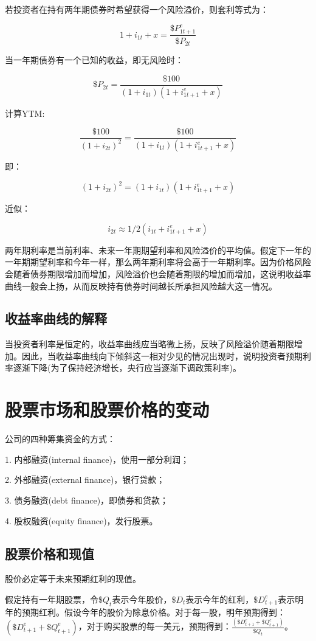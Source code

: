 \documentclass{article}
\begin{document}
若投资者在持有两年期债券时希望获得一个风险溢价，则套利等式为：

\[
1+i_{1t}+x=\frac{\$P^e_{1t+1}}{\$P_{2t}}
\]

当一年期债券有一个已知的收益，即无风险时：

\[
\$P_{2t}=\frac{\$100}{(1+i_{1t})(1+i^e_{1t+1}+x)}
\]

计算YTM:

\[
\frac{\$100}{(1+i_{2t})^2}=\frac{\$100}{(1+i_{1t})(1+i^e_{1t+1}+x)}
\]

即：

\[
(1+i_{2t})^2=(1+i_{1t})(1+i^e_{1t+1}+x)
\]

近似：

\[
i_{2t}\approx 1/2(i_{1t}+i^e_{1t+1}+x)
\]

两年期利率是当前利率、未来一年期期望利率和风险溢价的平均值。假定下一年的一年期期望利率和今年一样，那么两年期利率将会高于一年期利率。因为价格风险会随着债券期限增加而增加，风险溢价也会随着期限的增加而增加，这说明收益率曲线一般会上扬，从而反映持有债券时间越长所承担风险越大这一情况。

\subsection{收益率曲线的解释}

当投资者利率是恒定的，收益率曲线应当略微上扬，反映了风险溢价随着期限增加。因此，当收益率曲线向下倾斜这一相对少见的情况出现时，说明投资者预期利率逐渐下降(为了保持经济增长，央行应当逐渐下调政策利率)。

\section{股票市场和股票价格的变动}

公司的四种筹集资金的方式：

1. 内部融资(internal finance)，使用一部分利润；

2. 外部融资(external finance)，银行贷款；

3. 债务融资(debt finance)，即债券和贷款；

4. 股权融资(equity finance)，发行股票。


\subsection{股票价格和现值}

股价必定等于未来预期红利的现值。

假定持有一年期股票，令$ \$Q_t $表示今年股价，$ \$D_t $表示今年的红利，$ \$D^e_{t+1} $表示明年的预期红利。假设今年的股价为除息价格。对于每一股，明年预期得到：$ (\$D^e_{t+1}+\$Q^e_{t+1}) $，对于购买股票的每一美元，预期得到：$ \frac{(\$D^e_{t+1}+\$Q^e_{t+1})}{\$Q_t} $。
\end{document}
